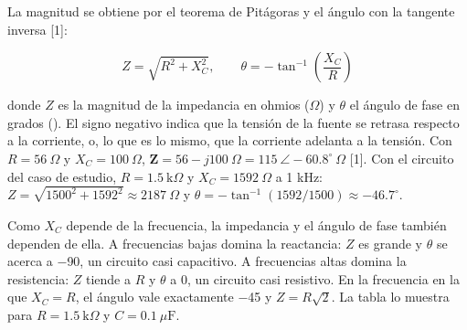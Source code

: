 \documentclass[11pt,letterpaper]{article}
\begin{document}
La magnitud se obtiene por el teorema de Pitágoras y el ángulo con la tangente inversa [1]:

\begin{equation}
  Z = \sqrt{R^{2} + X_C^{2}}, \qquad \theta = -\tan^{-1}\!\left(\frac{X_C}{R}\right)
\end{equation}

donde $Z$ es la magnitud de la impedancia en ohmios (\ensuremath{\Omega}) y $\theta$ el ángulo de fase en grados (\textdegree{}). El signo negativo indica que la tensión de la fuente se retrasa respecto a la corriente, o, lo que es lo mismo, que la corriente adelanta a la tensión. Con $R = 56\ \Omega$ y $X_C = 100\ \Omega$, $\mathbf{Z} = 56 - j100\ \Omega = 115\ \angle -60.8^\circ\ \Omega$ [1]. Con el circuito del caso de estudio, $R = 1.5\ \text{k}\Omega$ y $X_C = 1592\ \Omega$ a 1 kHz: $Z = \sqrt{1500^2 + 1592^2} \approx 2187\ \Omega$ y $\theta = -\tan^{-1}(1592/1500) \approx -46.7^\circ$.

Como $X_C$ depende de la frecuencia, la impedancia y el ángulo de fase también dependen de ella. A frecuencias bajas domina la reactancia: $Z$ es grande y $\theta$ se acerca a \ensuremath{-}90\textdegree{}, un circuito casi capacitivo. A frecuencias altas domina la resistencia: $Z$ tiende a $R$ y $\theta$ a 0\textdegree{}, un circuito casi resistivo. En la frecuencia en la que $X_C = R$, el ángulo vale exactamente \ensuremath{-}45\textdegree{} y $Z = R\sqrt{2}$. La tabla lo muestra para $R = 1.5\ \text{k}\Omega$ y $C = 0.1\ \mu\text{F}$.
\end{document}
